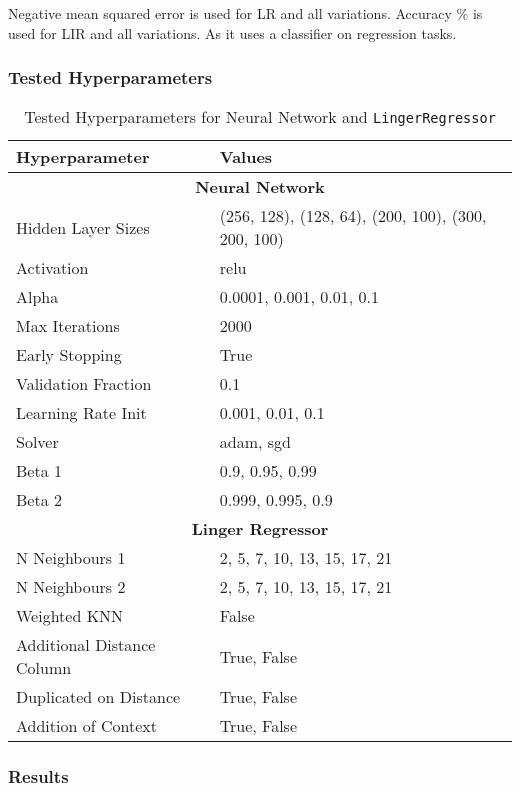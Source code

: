 \documentclass[a4paper, 12pt]{report}
\begin{document}
Negative mean squared error is used for LR and all variations.
Accuracy $\%$ is used for LIR and all variations. As it uses a classifier on regression tasks.
\subsubsection{Tested Hyperparameters}

\begin{table}[H]
    \centering
    \caption{Tested Hyperparameters for Neural Network and \texttt{LingerRegressor}}
    \label{tab:hyperparameters_abalone}
    \begin{tabular}{|l|l|}
    \hline
    \textbf{Hyperparameter} & \textbf{Values} \\ \hline
    \multicolumn{2}{|c|}{\textbf{Neural Network}} \\ \hline
    Hidden Layer Sizes & (256, 128), (128, 64), (200, 100), (300, 200, 100) \\ \hline
    Activation & relu \\ \hline
    Alpha & 0.0001, 0.001, 0.01, 0.1 \\ \hline
    Max Iterations & 2000 \\ \hline
    Early Stopping & True \\ \hline
    Validation Fraction & 0.1 \\ \hline
    Learning Rate Init & 0.001, 0.01, 0.1 \\ \hline
    Solver & adam, sgd \\ \hline
    Beta 1 & 0.9, 0.95, 0.99 \\ \hline
    Beta 2 & 0.999, 0.995, 0.9 \\ \hline
    \multicolumn{2}{|c|}{\textbf{Linger Regressor}} \\ \hline
    N Neighbours 1 & 2, 5, 7, 10, 13, 15, 17, 21 \\ \hline
    N Neighbours 2 & 2, 5, 7, 10, 13, 15, 17, 21 \\ \hline
    Weighted KNN & False \\ \hline
    Additional Distance Column & True, False \\ \hline
    Duplicated on Distance & True, False \\ \hline
    Addition of Context & True, False \\ \hline
    \end{tabular}
\end{table}
\clearpage

\subsubsection{Results}
\end{document}
